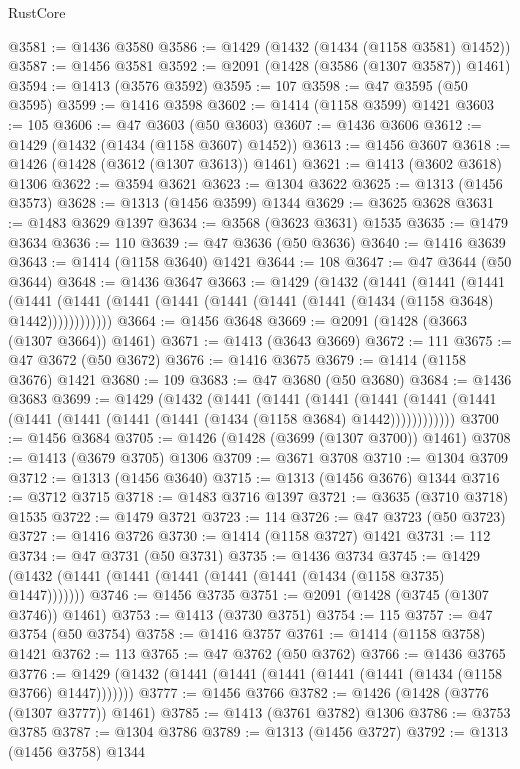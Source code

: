 \begin{lexlean}{RustCore}
\begin{coremodule}
@3581 := @1436 @3580
@3586 := @1429 (@1432 (@1434 (@1158 @3581) @1452))
@3587 := @1456 @3581
@3592 := @2091 (@1428 (@3586 (@1307 @3587)) @1461)
@3594 := @1413 (@3576 @3592)
@3595 := 107
@3598 := @47 @3595 (@50 @3595)
@3599 := @1416 @3598
@3602 := @1414 (@1158 @3599) @1421
@3603 := 105
@3606 := @47 @3603 (@50 @3603)
@3607 := @1436 @3606
@3612 := @1429 (@1432 (@1434 (@1158 @3607) @1452))
@3613 := @1456 @3607
@3618 := @1426 (@1428 (@3612 (@1307 @3613)) @1461)
@3621 := @1413 (@3602 @3618) @1306
@3622 := @3594 @3621
@3623 := @1304 @3622
@3625 := @1313 (@1456 @3573)
@3628 := @1313 (@1456 @3599) @1344
@3629 := @3625 @3628
@3631 := @1483 @3629 @1397
@3634 := @3568 (@3623 @3631) @1535
@3635 := @1479 @3634
@3636 := 110
@3639 := @47 @3636 (@50 @3636)
@3640 := @1416 @3639
@3643 := @1414 (@1158 @3640) @1421
@3644 := 108
@3647 := @47 @3644 (@50 @3644)
@3648 := @1436 @3647
@3663 := @1429
    (@1432
      (@1441
        (@1441
          (@1441
            (@1441 (@1441 (@1441 (@1441 (@1441 (@1441 (@1441 (@1434 (@1158 @3648) @1442))))))))))))
@3664 := @1456 @3648
@3669 := @2091 (@1428 (@3663 (@1307 @3664)) @1461)
@3671 := @1413 (@3643 @3669)
@3672 := 111
@3675 := @47 @3672 (@50 @3672)
@3676 := @1416 @3675
@3679 := @1414 (@1158 @3676) @1421
@3680 := 109
@3683 := @47 @3680 (@50 @3680)
@3684 := @1436 @3683
@3699 := @1429
    (@1432
      (@1441
        (@1441
          (@1441
            (@1441 (@1441 (@1441 (@1441 (@1441 (@1441 (@1441 (@1434 (@1158 @3684) @1442))))))))))))
@3700 := @1456 @3684
@3705 := @1426 (@1428 (@3699 (@1307 @3700)) @1461)
@3708 := @1413 (@3679 @3705) @1306
@3709 := @3671 @3708
@3710 := @1304 @3709
@3712 := @1313 (@1456 @3640)
@3715 := @1313 (@1456 @3676) @1344
@3716 := @3712 @3715
@3718 := @1483 @3716 @1397
@3721 := @3635 (@3710 @3718) @1535
@3722 := @1479 @3721
@3723 := 114
@3726 := @47 @3723 (@50 @3723)
@3727 := @1416 @3726
@3730 := @1414 (@1158 @3727) @1421
@3731 := 112
@3734 := @47 @3731 (@50 @3731)
@3735 := @1436 @3734
@3745 := @1429 (@1432 (@1441 (@1441 (@1441 (@1441 (@1441 (@1434 (@1158 @3735) @1447)))))))
@3746 := @1456 @3735
@3751 := @2091 (@1428 (@3745 (@1307 @3746)) @1461)
@3753 := @1413 (@3730 @3751)
@3754 := 115
@3757 := @47 @3754 (@50 @3754)
@3758 := @1416 @3757
@3761 := @1414 (@1158 @3758) @1421
@3762 := 113
@3765 := @47 @3762 (@50 @3762)
@3766 := @1436 @3765
@3776 := @1429 (@1432 (@1441 (@1441 (@1441 (@1441 (@1441 (@1434 (@1158 @3766) @1447)))))))
@3777 := @1456 @3766
@3782 := @1426 (@1428 (@3776 (@1307 @3777)) @1461)
@3785 := @1413 (@3761 @3782) @1306
@3786 := @3753 @3785
@3787 := @1304 @3786
@3789 := @1313 (@1456 @3727)
@3792 := @1313 (@1456 @3758) @1344

\end{coremodule}
\end{lexlean}
